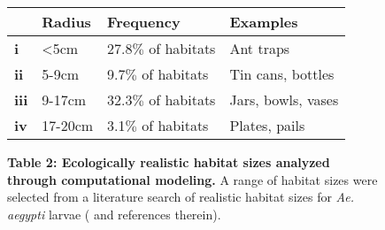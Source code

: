 \begin{figure}[t!]
\bgroup \small {}
\begin{tabular}{ l|l|l|l } 
    & \textbf{Radius} & 
    \textbf{Frequency} & \textbf{Examples}  \\
\hline \hline
    \textbf{i} & <5cm & 27.8${\%}$ of habitats & Ant traps \\ 
\hline
   \textbf{ii} & 5-9cm & 9.7${\%}$ of habitats & Tin cans, bottles \\ 
\hline
   \textbf{iii} & 9-17cm & 32.3${\%}$ of habitats & Jars, bowls, vases \\ 
\hline
    \textbf{iv} & 17-20cm & 3.1${\%}$ of habitats & Plates, pails \\ 
\hline \end{tabular} \egroup
\caption*{\textbf{Table 2: Ecologically realistic habitat sizes analyzed through computational modeling.} A range of habitat sizes were selected from a literature search of realistic habitat sizes for \textit{Ae. aegypti} larvae (\cite{Chan1971-sr} and references therein). 
}
\end{figure}